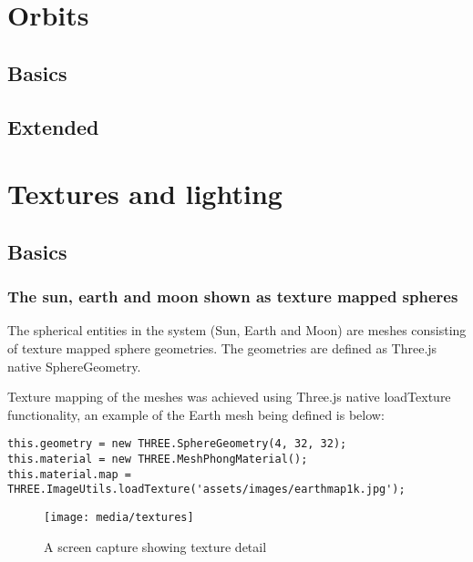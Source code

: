 \documentclass[titlepage]{article}
\begin{document}
\section{Orbits}

\subsection{Basics}

\subsection{Extended}

\section{Textures and lighting}

\subsection{Basics}
\subsubsection{The sun, earth and moon shown as texture mapped spheres}

The spherical entities in the system (Sun, Earth and Moon) are meshes consisting of texture mapped sphere geometries. The geometries are defined as Three.js native SphereGeometry.

Texture mapping of the meshes was achieved using Three.js native loadTexture functionality, an example of the Earth mesh being defined is below:
\begin{lstlisting}
this.geometry = new THREE.SphereGeometry(4, 32, 32);
this.material = new THREE.MeshPhongMaterial();
this.material.map = THREE.ImageUtils.loadTexture('assets/images/earthmap1k.jpg');
\end{lstlisting}

\begin{figure}[h!]
                \centering
                \texttt{[image: media/textures]}
                \caption{A screen capture showing texture detail}
                \label{fig:basic_model}
\end{figure}
\end{document}
